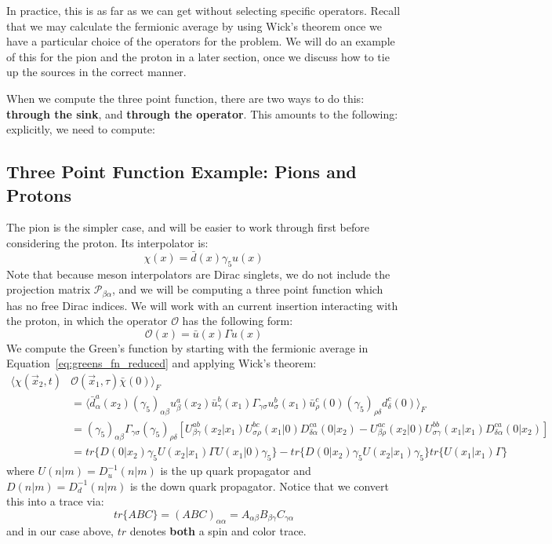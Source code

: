 \documentclass[11pt, oneside]{article}   	%
\theoremstyle{definition}
\begin{document}
In practice, this is as far as we can get without selecting specific operators. Recall that we may calculate the fermionic average by using Wick's 
theorem once we have a particular choice of the operators for the problem. We will do an example of this for the pion and the proton in a later 
section, once we discuss how to tie up the sources in the correct manner. 

When we compute the three point function, there are two ways to do this: \textbf{through the sink}, and \textbf{through the operator}. This amounts to 
the following: explicitly, we need to compute:

\subsection{Three Point Function Example: Pions and Protons}

The pion is the simpler case, and will be easier to work through first before considering the proton. Its interpolator is:
\begin{equation}
	\chi(x) = \bar d(x)\gamma_5 u(x)
\end{equation}
Note that because meson interpolators are Dirac singlets, we do not include the projection matrix $\mathcal P_{\beta\alpha}$, and we will be 
computing a three point function which has no free Dirac indices. We will work with an current insertion interacting with the proton, in which the 
operator $\mathcal O$ has the following form: 
\begin{equation}
	\mathcal O(x) = \bar u(x)\Gamma u(x)
\end{equation}
We compute the Green's function by starting with the fermionic average in Equation~\ref{eq:greens_fn_reduced} and applying Wick's theorem:
\begin{align}
	\langle\chi(\vec x_2, t) & \mathcal O(\vec x_1, \tau)\bar\chi(0)\rangle_F \nonumber\\ 
	&= \langle \bar d_\alpha^a(x_2)\left(\gamma_5\right)_{\alpha\beta}
	 u_\beta^a(x_2)\bar u_\gamma^b(x_1)\Gamma_{\gamma\sigma}u_\sigma^b(x_1)\bar u_\rho^c(0)\left(\gamma_5\right)_{\rho\delta}
	 d_\delta^c(0)\rangle_F \nonumber \\
	 &= (\gamma_5)_{\alpha\beta}\Gamma_{\gamma\sigma}(\gamma_5)_{\rho\delta}\left[
	U_{\beta\gamma}^{ab}(x_2 | x_1) U_{\sigma\rho}^{bc}(x_1 | 0) D_{\delta\alpha}^{ca}(0 | x_2)
	- U_{\beta\rho}^{ac}(x_2 | 0) U_{\sigma\gamma}^{bb}(x_1 | x_1) D_{\delta\alpha}^{ca}(0 | x_2)
	 \right] \nonumber \\
	 &= tr\{D(0 | x_2)\gamma_5 U(x_2 | x_1) \Gamma U(x_1 | 0) \gamma_5\} - tr\{D(0 | x_2)\gamma_5 U(x_2 | x_1) \gamma_5 \}
	 tr\{U(x_1 | x_1)\Gamma\}
	 \label{eq:pion_threept}
\end{align}
where $U(n|m) = D_u^{-1}(n|m)$ is the up quark propagator and $D(n|m) = D_d^{-1}(n|m)$ is the down quark propagator. Notice that we convert 
this into a trace via:
\begin{equation}
	tr\{ABC\} = (ABC)_{\alpha\alpha} = A_{\alpha\beta} B_{\beta\gamma} C_{\gamma\alpha}
\end{equation}
and in our case above, $tr$ denotes \textbf{both} a spin and color trace. 
\end{document}
